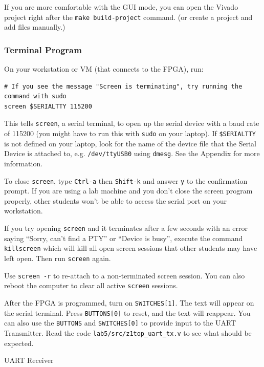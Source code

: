\documentclass[11pt]{article}
\makeatletter
\renewcommand{\subsection}
{\@startsection {subsection}{1}{0pt}
 {-1ex}
 {0.5ex}
 {\bfseries\normalsize}}
\makeatother
\begin{document}
If you are more comfortable with the GUI mode, you can open the Vivado project right after the \texttt{make build-project} command. (or create a project and add files manually.)

\subsubsection{Terminal Program}
On your workstation or VM (that connects to the FPGA), run:

\begin{verbatim}
# If you see the message "Screen is terminating", try running the command with sudo
screen $SERIALTTY 115200
\end{verbatim}

This tells \verb|screen|, a serial terminal, to open up the serial device with a baud rate of 115200 (you might have to run this with \verb|sudo| on your laptop). If \verb|$SERIALTTY| is not defined on your laptop, look for the name of the device file that the Serial Device is attached to, e.g. \verb|/dev/ttyUSB0| using \texttt{dmesg}. See the Appendix for more information.

To close \verb|screen|, type \verb|Ctrl-a| then \verb|Shift-k| and answer \verb|y| to the confirmation prompt.
If you are using a lab machine and you don't close the screen program properly, other students won't be able to access the serial port on your workstation.

If you try opening \verb|screen| and it terminates after a few seconds with an error saying ``Sorry, can't find a PTY'' or ``Device is busy'', execute the command \verb|killscreen| which will kill all open screen sessions that other students may have left open.
Then run \verb|screen| again.

Use \verb|screen -r| to re-attach to a non-terminated screen session. You can also reboot the computer to clear all active \verb|screen| sessions.

After the FPGA is programmed, turn on \verb|SWITCHES[1]|. The text will appear on the serial terminal. Press \verb|BUTTONS[0]| to reset, and the text will reappear. You can also use the \verb|BUTTONS| and \verb|SWITCHES[0]| to provide input to the UART Transmitter. Read the code \verb|lab5/src/z1top_uart_tx.v| to see what should be expected.

\subsection{UART Receiver}
\end{document}
